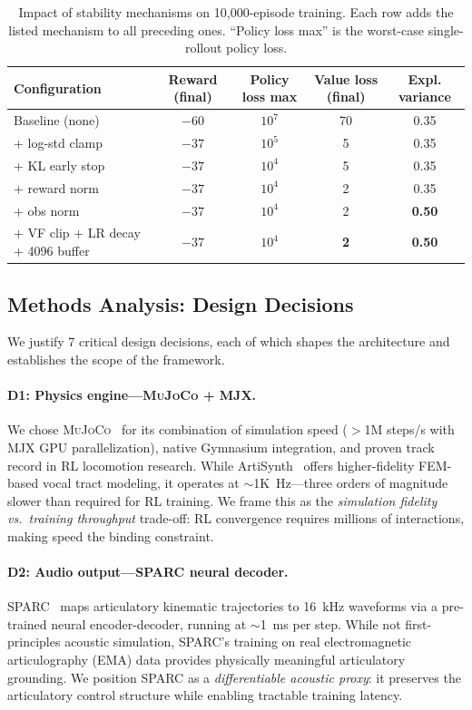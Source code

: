\documentclass[11pt, a4paper]{article}
\newcommand{\sparc}{\textsc{SPARC}}
\newcommand{\mujoco}{\textsc{MuJoCo}}
\begin{document}
\begin{table}[t]
\centering
\caption{Impact of stability mechanisms on 10,000-episode training. Each row adds the listed mechanism to all preceding ones. ``Policy loss max'' is the worst-case single-rollout policy loss.}
\label{tab:stability}
\small
\begin{tabular}{lcccc}
\toprule
Configuration & Reward (final) & Policy loss max & Value loss (final) & Expl. variance \\
\midrule
Baseline (none) & $-60$ & $10^7$ & 70 & 0.35 \\
+ log-std clamp & $-37$ & $10^5$ & 5 & 0.35 \\
+ KL early stop & $-37$ & $10^4$ & 5 & 0.35 \\
+ reward norm & $-37$ & $10^4$ & 2 & 0.35 \\
+ obs norm & $-37$ & $10^4$ & 2 & \textbf{0.50} \\
+ VF clip + LR decay + 4096 buffer & $-37$ & $10^4$ & \textbf{2} & \textbf{0.50} \\
\bottomrule
\end{tabular}
\end{table}

\subsection{Methods Analysis: Design Decisions}
\label{sec:methods_analysis}

We justify 7 critical design decisions, each of which shapes the architecture and establishes the scope of the framework.

\paragraph{D1: Physics engine---\mujoco{} + MJX.}
We chose \mujoco{}~\cite{todorov2012mujoco} for its combination of simulation speed ($>$1M steps/s with MJX GPU parallelization), native Gymnasium integration, and proven track record in RL locomotion research. While ArtiSynth~\cite{freeman2023artisynth} offers higher-fidelity FEM-based vocal tract modeling, it operates at $\sim$1K~Hz---three orders of magnitude slower than required for RL training. We frame this as the \emph{simulation fidelity vs.\ training throughput} trade-off: RL convergence requires millions of interactions, making speed the binding constraint.

\paragraph{D2: Audio output---\sparc{} neural decoder.}
\sparc{}~\cite{parrot2024sparc} maps articulatory kinematic trajectories to 16~kHz waveforms via a pre-trained neural encoder-decoder, running at $\sim$1~ms per step. While not first-principles acoustic simulation, \sparc{}'s training on real electromagnetic articulography (EMA) data provides physically meaningful articulatory grounding. We position \sparc{} as a \emph{differentiable acoustic proxy}: it preserves the articulatory control structure while enabling tractable training latency.
\end{document}
